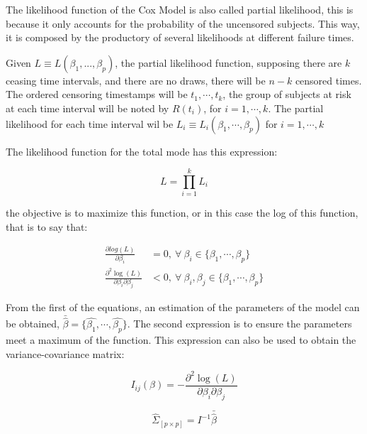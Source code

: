 \documentclass[11pt]{book} %
\begin{document}
      The likelihood function of the Cox Model is also called partial likelihood, this is because it only accounts for the probability of the uncensored subjects. This way, it is composed by the productory of several likelihoods at different failure times.

      Given $L\equiv L(\beta_1,...,\beta_p)$, the partial likelihood function, supposing there are $k$ ceasing time intervals, and there are no draws, there will be $n - k$ censored times. The ordered censoring timestamps will be $t_1, \cdots,t_k$, the group of subjects at risk at each time interval will be noted by $R(t_i)$, for $i=1,\cdots,k$. The partial likelihood for each time interval wil be $L_i\equiv L_i(\beta_1,\cdots,\beta_p)$ for $i=1,\cdots,k$

      The likelihood function for the total mode has this expression:

      \begin{equation}
        L = \prod_{i=1}^kL_i
        \label{eq:cox-partial-likelihood-prod}
      \end{equation}

      the objective is to maximize this function, or in this case the log of this function, that is to say that:

      \begin{equation}
        \begin{aligned}
          \frac{\partial log(L)}{\partial\beta_i} & = 0, \ \forall \ \beta_i \in \{\beta_1,\cdots,\beta_p\} \\
          \frac{\partial^2 \log(L)}{\partial\beta_i\partial\beta_j} & < 0,  \ \forall \ \beta_i,\beta_j \in \{\beta_1,\cdots,\beta_p\}
        \end{aligned}
        \label{eq:cox-max-likelihood-conditions}
      \end{equation}

      From the first of the equations, an estimation of the parameters of the model can be obtained, $\bar{\widehat{\beta}} = \{\widehat{\beta_1},\cdots,\widehat{\beta_p}\}$. The second expression is to ensure the parameters meet a maximum of the function. This expression can also be used to obtain the variance-covariance matrix:

      \begin{equation}
        I_{ij}(\beta) = - \frac{\partial^2\log(L)}{\partial\beta_i\partial\beta_j}
        \label{eq:cox-information matrix}
      \end{equation}

      \begin{equation}
        \widehat{\Sigma}_{[p\times p]} = I ^{-1} \bar{\widehat{\beta}}
        \label{eq:cox-variance-covariance-matrix-estimated}
      \end{equation}
\end{document}
